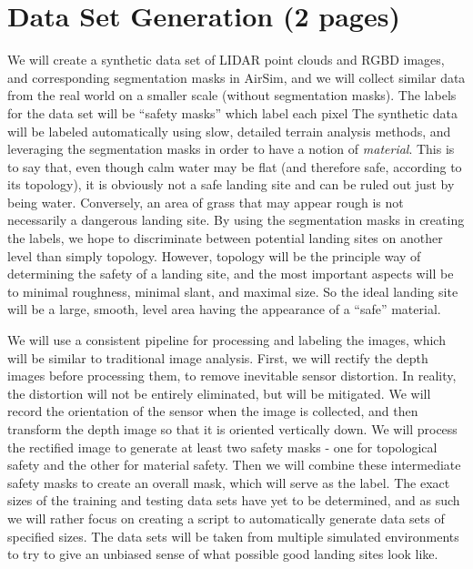 \section{Data Set Generation (2 pages)}

We will create a synthetic data set of LIDAR point clouds and RGBD images,
and corresponding segmentation masks in AirSim,
and we will collect similar data from the real world on a smaller scale (without segmentation masks).
The labels for the data set will be ``safety masks'' which label each pixel
The synthetic data will be labeled automatically using slow, detailed terrain analysis methods,
and leveraging the segmentation masks in order to have a notion of \textit{material}.
This is to say that, even though calm water may be flat (and therefore safe,
according to its topology),
it is obviously not a safe landing site and can be ruled out just by being water.
Conversely, an area of grass that may appear rough is not necessarily a dangerous landing site.
By using the segmentation masks in creating the labels,
we hope to discriminate between potential landing sites on another level than simply topology.
However, topology will be the principle way of determining the safety of a landing site,
and the most important aspects will be to minimal roughness, minimal slant, and maximal size.
So the ideal landing site will be a large, smooth, level area
having the appearance of a ``safe'' material.

We will use a consistent pipeline for processing and labeling the images,
which will be similar to traditional image analysis.
First, we will rectify the depth images before processing them,
to remove inevitable sensor distortion.
In reality, the distortion will not be entirely eliminated, but will be mitigated.
We will record the orientation of the sensor when the image is collected,
and then transform the depth image so that it is oriented vertically down.
We will process the rectified image to generate at least two safety masks -
one for topological safety and the other for material safety.
Then we will combine these intermediate safety masks to create an overall mask,
which will serve as the label.
The exact sizes of the training and testing data sets have yet to be determined, and as such we will rather focus
on creating a script to automatically generate data sets of specified sizes.
The data sets will be taken from multiple simulated environments to try to give an unbiased
sense of what possible good landing sites look like.

